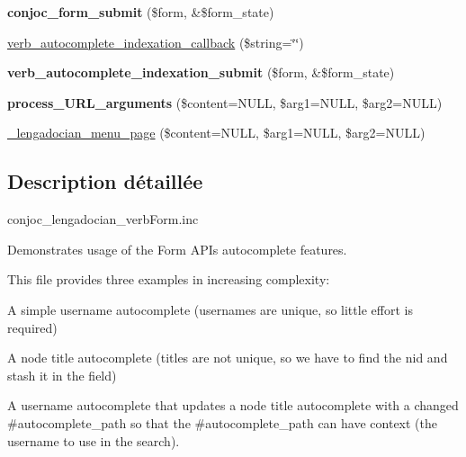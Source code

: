 \begin{DoxyCompactItemize}
\item 
\hypertarget{php_2conjoc__lengadocian__webForm_8inc_ad10d751f3d75ba568eb1f41bd43fcc94}{}\label{php_2conjoc__lengadocian__webForm_8inc_ad10d751f3d75ba568eb1f41bd43fcc94} 
{\bfseries conjoc\+\_\+form\+\_\+submit} (\$form, \&\$form\+\_\+state)
\item 
\hyperlink{php_2conjoc__lengadocian__webForm_8inc_a378d4601a46c698692d26cb301470598}{verb\+\_\+autocomplete\+\_\+indexation\+\_\+callback} (\$string=\char`\"{}\char`\"{})
\item 
\hypertarget{php_2conjoc__lengadocian__webForm_8inc_a5e7b0be9cab73b5b2be66499afd0edc5}{}\label{php_2conjoc__lengadocian__webForm_8inc_a5e7b0be9cab73b5b2be66499afd0edc5} 
{\bfseries verb\+\_\+autocomplete\+\_\+indexation\+\_\+submit} (\$form, \&\$form\+\_\+state)
\item 
\hypertarget{php_2conjoc__lengadocian__webForm_8inc_afecc813b5558b906fe6cc9adb1419c35}{}\label{php_2conjoc__lengadocian__webForm_8inc_afecc813b5558b906fe6cc9adb1419c35} 
{\bfseries process\+\_\+\+U\+R\+L\+\_\+arguments} (\$content=N\+U\+LL, \$arg1=N\+U\+LL, \$arg2=N\+U\+LL)
\item 
\hyperlink{php_2conjoc__lengadocian__webForm_8inc_a4ffe99e612db8d794975a33aefb781f7}{\+\_\+lengadocian\+\_\+menu\+\_\+page} (\$content=N\+U\+LL, \$arg1=N\+U\+LL, \$arg2=N\+U\+LL)
\end{DoxyCompactItemize}


\subsection{Description détaillée}
conjoc\+\_\+lengadocian\+\_\+verb\+Form.\+inc

Demonstrates usage of the Form A\+PI\textquotesingle{}s autocomplete features.

This file provides three examples in increasing complexity\+:
\begin{DoxyItemize}
\item A simple username autocomplete (usernames are unique, so little effort is required)
\item A node title autocomplete (titles are not unique, so we have to find the nid and stash it in the field)
\item A username autocomplete that updates a node title autocomplete with a changed \#autocomplete\+\_\+path so that the \#autocomplete\+\_\+path can have context (the username to use in the search). 
\end{DoxyItemize}

